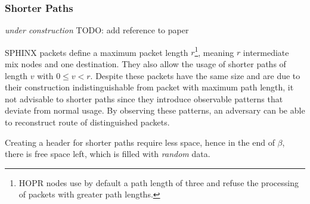 \subsubsection{Shorter Paths}
\label{sec:sphinx:shorterpaths}

\textit{under construction} TODO: add reference to paper

SPHINX packets define a maximum packet length $r$\footnote{HOPR nodes use by default a path length of three and refuse the processing of packets with greater path lengths.}, meaning $r$ intermediate mix nodes and one destination. They also allow the usage of shorter paths of length $v$ with $0 \le v < r$. Despite these packets have the same size and are due to their construction indistinguishable from packet with maximum path length, it not advisable to shorter paths since they introduce observable patterns that deviate from normal usage. By observing these patterns, an adversary can be able to reconstruct route of distinguished packets.

Creating a header for shorter paths require less space, hence in the end of $\beta$, there is free space left, which is filled with \textit{random} data.


